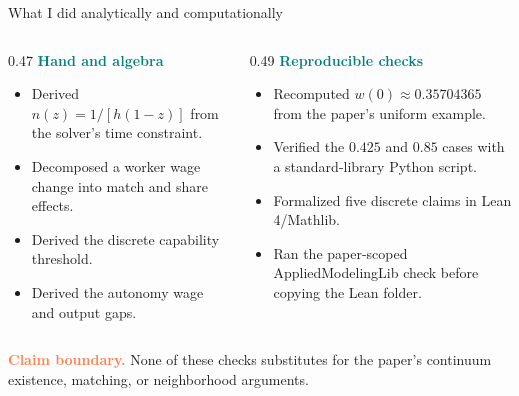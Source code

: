 \documentclass[aspectratio=169,11pt]{beamer}
\newcommand{\key}[1]{\textcolor{Teal}{\textbf{#1}}}
\newcommand{\caveat}[1]{\textcolor{Coral}{\textbf{#1}}}
\begin{document}
\begin{frame}{What I did analytically and computationally}
\small
\begin{columns}[T,totalwidth=\textwidth]
\begin{column}{0.47\textwidth}
  \key{Hand and algebra}
  \begin{itemize}\setlength\itemsep{0.10cm}
    \item Derived $n(z)=1/[h(1-z)]$ from the solver's time constraint.
    \item Decomposed a worker wage change into match and share effects.
    \item Derived the discrete capability threshold.
    \item Derived the autonomy wage and output gaps.
  \end{itemize}
\end{column}
\begin{column}{0.49\textwidth}
  \key{Reproducible checks}
  \begin{itemize}\setlength\itemsep{0.10cm}
    \item Recomputed $w(0)\approx0.35704365$ from the paper's uniform example.
    \item Verified the $0.425$ and $0.85$ cases with a standard-library Python script.
    \item Formalized five discrete claims in Lean 4/Mathlib.
    \item Ran the paper-scoped AppliedModelingLib check before copying the Lean folder.
  \end{itemize}
\end{column}
\end{columns}

\vfill
\caveat{Claim boundary.} None of these checks substitutes for the paper's
continuum existence, matching, or neighborhood arguments.
\end{frame}
\end{document}
